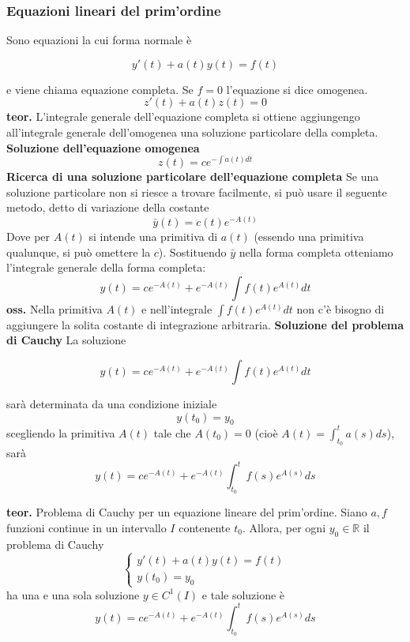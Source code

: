 \subsubsection*{Equazioni lineari del prim'ordine}
Sono equazioni la cui forma normale è
\begin{tcolorbox}
\[
    y'(t) + a(t)y(t) = f(t)
\]
\end{tcolorbox}
e viene chiama equazione completa.\newline
Se $f = 0$ l'equazione si dice omogenea.
\[
    z'(t) + a(t)z(t) = 0
\]
\textbf{teor.} L'integrale generale dell'equazione completa si ottiene aggiungengo all'integrale generale dell'omogenea una soluzione particolare della completa.\newline
\textbf{Soluzione dell'equazione omogenea}
\[
    z(t) = c e^{-\int a(t) dt}
\]
\textbf{Ricerca di una soluzione particolare dell'equazione completa}\newline
Se una soluzione particolare non si riesce a trovare facilmente, si può usare il seguente metodo, detto di variazione della costante
\[
    \bar{y}(t) = c(t)e^{-A(t)}
\]
Dove per $A(t)$ si intende una primitiva di $a(t)$ (essendo una primitiva qualunque, si può omettere la $c$).\newline
Sostituendo $\bar{y}$ nella forma completa otteniamo l'integrale generale della forma completa:
\[
    y(t) = ce^{-A(t)} + e^{-A(t)}\int f(t)e^{A(t)}dt
\]
\textbf{oss.} Nella primitiva $A(t)$ e nell'integrale $\int f(t)e^{A(t)}dt$ non c'è bisogno di aggiungere la solita costante di integrazione arbitraria.\newline
\newline
\textbf{Soluzione del problema di Cauchy}\newline
La soluzione
\begin{tcolorbox} 
\[
    y(t) = ce^{-A(t)} + e^{-A(t)}\int f(t)e^{A(t)}dt
\]
\end{tcolorbox}
sarà determinata da una condizione iniziale
\[
    y(t_0) = y_0
\]
scegliendo la primitiva $A(t)$ tale che $A(t_0) = 0$ (cioè $A(t) = \int_{t_0}^{t}a(s)ds$), sarà
\[
    y(t) = ce^{-A(t)} + e^{-A(t)} \int_{t_0}^{t} f(s)e^{A(s)}ds
\]
\begin{tcolorbox}
\textbf{teor.} Problema di Cauchy per un equazione lineare del prim'ordine.\newline
Siano $a, f$ funzioni continue in un intervallo $I$ contenente $t_0$. Allora, per ogni $y_0 \in \mathbb{R}$ il problema di Cauchy
\[
    \begin{cases}
        y'(t) + a(t)y(t)= f(t)\\
        y(t_0) = y_0
    \end{cases}
\]
ha una e una sola soluzione $y \in C^1(I)$ e tale soluzione è
\[
    y(t) = ce^{-A(t)} + e^{-A(t)} \int_{t_0}^{t} f(s)e^{A(s)}ds
\]
\end{tcolorbox}
